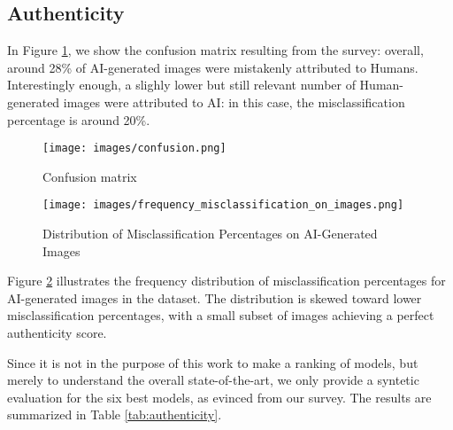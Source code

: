 \documentclass[sn-mathphys]{sn-jnl}
\begin{document}
\subsection{Authenticity}
In Figure \ref{fig:confusion}, we show the confusion matrix
resulting from the survey: overall, around 28\% of AI-generated images were mistakenly attributed to Humans.
Interestingly enough, a slighly lower but still relevant number of Human-generated images were attributed to AI: in this case, the misclassification percentage is around 20\%.

\begin{figure}[h]
    \centering
    \texttt{[image: images/confusion.png]}
    \caption{Confusion matrix}
    \label{fig:confusion}
\end{figure}


\begin{figure}[h]
    \centering
    \texttt{[image: images/frequency\_misclassification\_on\_images.png]}
    \caption{Distribution of Misclassification Percentages on AI-Generated Images}
    \label{fig:distribution_misclassification_on_images}
\end{figure}
Figure \ref{fig:distribution_misclassification_on_images} illustrates the frequency distribution of misclassification percentages for AI-generated images in the dataset. The distribution is skewed toward lower misclassification percentages, with a small subset of images achieving a perfect authenticity score.

Since it is not in the purpose of this work to make a
ranking of models, but merely to understand the overall
state-of-the-art, we only provide a syntetic evaluation
for the six best models, as evinced from  our survey. 
The results are summarized in Table \ref{tab:authenticity}.
\end{document}
